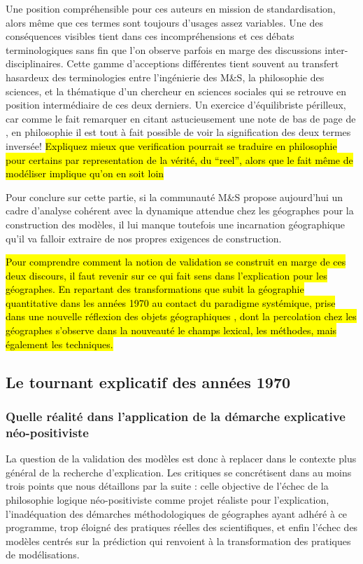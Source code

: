Une position compréhensible pour ces auteurs en mission de standardisation, alors même que ces termes sont toujours d'usages assez variables. Une des conséquences visibles tient dans ces incompréhensions et ces débats terminologiques sans fin \autocite{David2009} que l'on observe parfois en marge des discussions inter-disciplinaires. Cette gamme d'acceptions différentes tient souvent au transfert hasardeux des terminologies entre l'ingénierie des M\&S, la philosophie des sciences, et la thématique d'un chercheur en sciences sociales qui se retrouve en position intermédiaire de ces deux derniers. Un exercice d'équilibriste périlleux, car comme le fait remarquer \textcite{Kleijnen1995} en citant astucieusement une note de bas de page de \textcite{Barlas1990}, en philosophie il est tout à fait possible de voir la signification des deux termes inversée! \hl{Expliquez mieux que verification pourrait se traduire en philosophie pour certains par representation de la vérité, du “reel”, alors que le fait même de modéliser implique qu’on en soit loin}

Pour conclure sur cette partie, si la communauté M\&S propose aujourd'hui un cadre d'analyse cohérent avec la dynamique attendue chez les géographes pour la construction des modèles, il lui manque toutefois une incarnation géographique qu'il va falloir extraire de nos propres exigences de construction.

\hl{Pour comprendre comment la notion de validation se construit en marge de ces deux discours, il faut revenir sur ce qui fait sens dans l'explication pour les géographes. En repartant des transformations que subit la géographie quantitative dans les années 1970 au contact du paradigme systémique, prise dans une nouvelle réflexion des objets géographiques , dont la percolation chez les géographes s'observe dans la nouveauté le champs lexical, les méthodes, mais également les techniques.}

\subsection{Le tournant explicatif des années 1970}
\label{ssec:transition_annee70}

\subsubsection{Quelle réalité dans l'application de la démarche explicative néo-positiviste}
\label{sssec:realite_neopositiviste}

La question de la validation des modèles est donc à replacer dans le contexte plus général de la recherche d'explication. Les critiques se concrétisent dans au moins trois points que nous détaillons par la suite : celle objective de l'échec de la philosophie logique néo-positiviste comme projet réaliste pour l'explication, l'inadéquation des démarches méthodologiques de géographes ayant adhéré à ce programme, trop éloigné des pratiques réelles des scientifiques, et enfin l’échec des modèles centrés sur la prédiction qui renvoient à la transformation des pratiques de modélisations.

